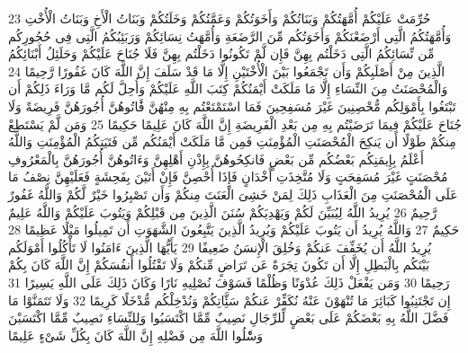 {\tiny\colorbox{cl_aya}{23}} حُرِّمَتْ عَلَيْكُمْ أُمَّهَتُكُمْ وَبَنَاتُكُمْ وَأَخَوَتُكُمْ وَعَمَّتُكُمْ وَخَلَتُكُمْ وَبَنَاتُ الْأَخِ وَبَنَاتُ الْأُخْتِ وَأُمَّهَتُكُمُ الَّتِى أَرْضَعْنَكُمْ وَأَخَوَتُكُم مِّنَ الرَّضَعَةِ وَأُمَّهَتُ نِسَائِكُمْ وَرَبَئِبُكُمُ الَّتِى فِى حُجُورِكُم مِّن نِّسَائِكُمُ الَّتِى دَخَلْتُم بِهِنَّ فَإِن لَّمْ تَكُونُوا دَخَلْتُم بِهِنَّ فَلَا جُنَاحَ عَلَيْكُمْ وَحَلَئِلُ أَبْنَائِكُمُ الَّذِينَ مِنْ أَصْلَبِكُمْ وَأَن تَجْمَعُوا بَيْنَ الْأُخْتَيْنِ إِلَّا مَا قَدْ سَلَفَ إِنَّ اللَّهَ كَانَ غَفُورًا رَّحِيمًا
{\tiny\colorbox{cl_aya}{24}} وَالْمُحْصَنَتُ مِنَ النِّسَاءِ إِلَّا مَا مَلَكَتْ أَيْمَنُكُمْ كِتَبَ اللَّهِ عَلَيْكُمْ وَأُحِلَّ لَكُم مَّا وَرَاءَ ذَلِكُمْ أَن تَبْتَغُوا بِأَمْوَلِكُم مُّحْصِنِينَ غَيْرَ مُسَفِحِينَ فَمَا اسْتَمْتَعْتُم بِهِ مِنْهُنَّ فََٔاتُوهُنَّ أُجُورَهُنَّ فَرِيضَةً وَلَا جُنَاحَ عَلَيْكُمْ فِيمَا تَرَضَيْتُم بِهِ مِن بَعْدِ الْفَرِيضَةِ إِنَّ اللَّهَ كَانَ عَلِيمًا حَكِيمًا
{\tiny\colorbox{cl_aya}{25}} وَمَن لَّمْ يَسْتَطِعْ مِنكُمْ طَوْلًا أَن يَنكِحَ الْمُحْصَنَتِ الْمُؤْمِنَتِ فَمِن مَّا مَلَكَتْ أَيْمَنُكُم مِّن فَتَيَتِكُمُ الْمُؤْمِنَتِ وَاللَّهُ أَعْلَمُ بِإِيمَنِكُم بَعْضُكُم مِّن بَعْضٍ فَانكِحُوهُنَّ بِإِذْنِ أَهْلِهِنَّ وَءَاتُوهُنَّ أُجُورَهُنَّ بِالْمَعْرُوفِ مُحْصَنَتٍ غَيْرَ مُسَفِحَتٍ وَلَا مُتَّخِذَتِ أَخْدَانٍ فَإِذَا أُحْصِنَّ فَإِنْ أَتَيْنَ بِفَحِشَةٍ فَعَلَيْهِنَّ نِصْفُ مَا عَلَى الْمُحْصَنَتِ مِنَ الْعَذَابِ ذَلِكَ لِمَنْ خَشِىَ الْعَنَتَ مِنكُمْ وَأَن تَصْبِرُوا خَيْرٌ لَّكُمْ وَاللَّهُ غَفُورٌ رَّحِيمٌ
{\tiny\colorbox{cl_aya}{26}} يُرِيدُ اللَّهُ لِيُبَيِّنَ لَكُمْ وَيَهْدِيَكُمْ سُنَنَ الَّذِينَ مِن قَبْلِكُمْ وَيَتُوبَ عَلَيْكُمْ وَاللَّهُ عَلِيمٌ حَكِيمٌ
{\tiny\colorbox{cl_aya}{27}} وَاللَّهُ يُرِيدُ أَن يَتُوبَ عَلَيْكُمْ وَيُرِيدُ الَّذِينَ يَتَّبِعُونَ الشَّهَوَتِ أَن تَمِيلُوا مَيْلًا عَظِيمًا
{\tiny\colorbox{cl_aya}{28}} يُرِيدُ اللَّهُ أَن يُخَفِّفَ عَنكُمْ وَخُلِقَ الْإِنسَنُ ضَعِيفًا
{\tiny\colorbox{cl_aya}{29}} يَأَيُّهَا الَّذِينَ ءَامَنُوا لَا تَأْكُلُوا أَمْوَلَكُم بَيْنَكُم بِالْبَطِلِ إِلَّا أَن تَكُونَ تِجَرَةً عَن تَرَاضٍ مِّنكُمْ وَلَا تَقْتُلُوا أَنفُسَكُمْ إِنَّ اللَّهَ كَانَ بِكُمْ رَحِيمًا
{\tiny\colorbox{cl_aya}{30}} وَمَن يَفْعَلْ ذَلِكَ عُدْوَنًا وَظُلْمًا فَسَوْفَ نُصْلِيهِ نَارًا وَكَانَ ذَلِكَ عَلَى اللَّهِ يَسِيرًا
{\tiny\colorbox{cl_aya}{31}} إِن تَجْتَنِبُوا كَبَائِرَ مَا تُنْهَوْنَ عَنْهُ نُكَفِّرْ عَنكُمْ سَئَِّاتِكُمْ وَنُدْخِلْكُم مُّدْخَلًا كَرِيمًا
{\tiny\colorbox{cl_aya}{32}} وَلَا تَتَمَنَّوْا مَا فَضَّلَ اللَّهُ بِهِ بَعْضَكُمْ عَلَى بَعْضٍ لِّلرِّجَالِ نَصِيبٌ مِّمَّا اكْتَسَبُوا وَلِلنِّسَاءِ نَصِيبٌ مِّمَّا اكْتَسَبْنَ وَسَْٔلُوا اللَّهَ مِن فَضْلِهِ إِنَّ اللَّهَ كَانَ بِكُلِّ شَىْءٍ عَلِيمًا
